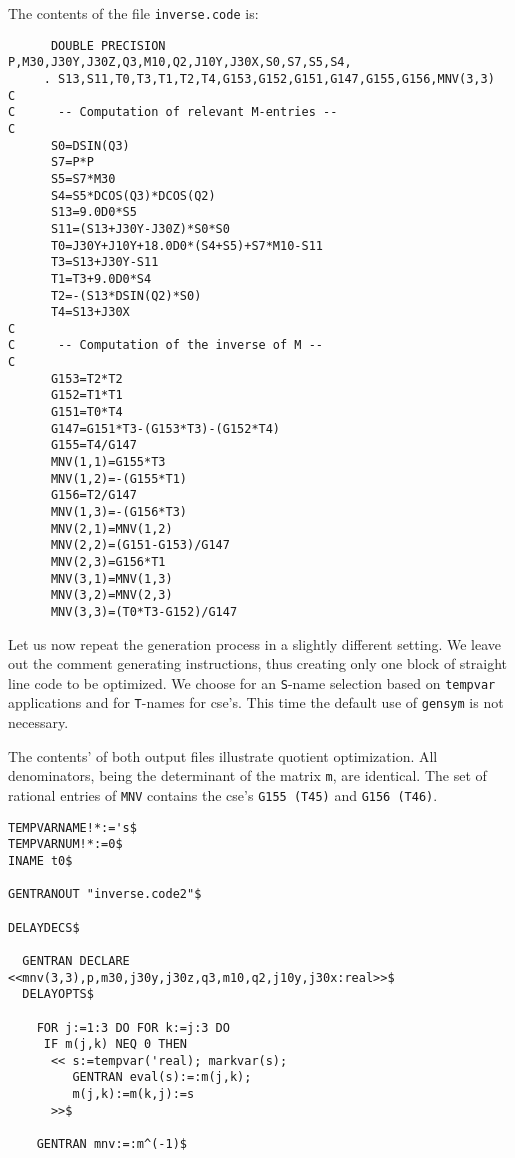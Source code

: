 {The contents of the file {\tt inverse.code} is:
{\small
\begin{verbatim}
      DOUBLE PRECISION P,M30,J30Y,J30Z,Q3,M10,Q2,J10Y,J30X,S0,S7,S5,S4,
     . S13,S11,T0,T3,T1,T2,T4,G153,G152,G151,G147,G155,G156,MNV(3,3)
C       
C      -- Computation of relevant M-entries --
C       
      S0=DSIN(Q3)
      S7=P*P
      S5=S7*M30
      S4=S5*DCOS(Q3)*DCOS(Q2)
      S13=9.0D0*S5
      S11=(S13+J30Y-J30Z)*S0*S0
      T0=J30Y+J10Y+18.0D0*(S4+S5)+S7*M10-S11
      T3=S13+J30Y-S11
      T1=T3+9.0D0*S4
      T2=-(S13*DSIN(Q2)*S0)
      T4=S13+J30X
C       
C      -- Computation of the inverse of M --
C       
      G153=T2*T2
      G152=T1*T1
      G151=T0*T4
      G147=G151*T3-(G153*T3)-(G152*T4)
      G155=T4/G147
      MNV(1,1)=G155*T3
      MNV(1,2)=-(G155*T1)
      G156=T2/G147
      MNV(1,3)=-(G156*T3)
      MNV(2,1)=MNV(1,2)
      MNV(2,2)=(G151-G153)/G147
      MNV(2,3)=G156*T1
      MNV(3,1)=MNV(1,3)
      MNV(3,2)=MNV(2,3)
      MNV(3,3)=(T0*T3-G152)/G147
\end{verbatim}}

Let us now repeat the generation process in a slightly different setting.
We leave out the comment generating instructions, thus creating only one
block of straight line code to be optimized. We choose for an {\tt S}-name
selection based on {\tt tempvar} applications and for {\tt T}-names for cse's.
This time the default use of {\tt gensym} is not necessary.

The contents' of both output files illustrate quotient optimization.
All denominators, being the determinant of the matrix {\tt m}, are identical.
The set of rational entries of {\tt MNV} contains the cse's {\tt G155 (T45)}
and {\tt G156 (T46)}.
{\small
\begin{verbatim}
TEMPVARNAME!*:='s$
TEMPVARNUM!*:=0$
INAME t0$

GENTRANOUT "inverse.code2"$

DELAYDECS$

  GENTRAN DECLARE <<mnv(3,3),p,m30,j30y,j30z,q3,m10,q2,j10y,j30x:real>>$
  DELAYOPTS$

    FOR j:=1:3 DO FOR k:=j:3 DO
     IF m(j,k) NEQ 0 THEN
      << s:=tempvar('real); markvar(s);
         GENTRAN eval(s):=:m(j,k);
         m(j,k):=m(k,j):=s
      >>$

    GENTRAN mnv:=:m^(-1)$


\end{verbatim}}}
